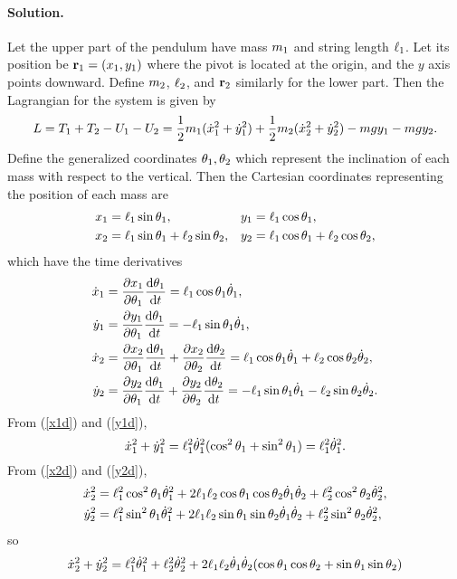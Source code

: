 \documentclass[11pt]{article}
\newcommand{\refeq}[1]{(\ref{#1})}
\newenvironment{solution}
{
    \paragraph{Solution.}
    \ignorespaces
}
{
    \bigskip
}
\begin{document}
\begin{solution}
	Let the upper part of the pendulum have mass $m_1$ and string length $\ell_1$.  Let its position be $\mathbf{r}_1 = (x_1, y_1)$ where the pivot is located at the origin, and the $y$ axis points downward.  Define $m_2$, $\ell_2$, and $\mathbf{r}_2$ similarly for the lower part.  Then the Lagrangian for the system is given by
	\begin{equation} \label{lagrdp}
		L = T_1 + T_2 - U_1 - U_2 = \frac{1}{2} m_1 (\dot{x}_1^2 + \dot{y}_1^2) + \frac{1}{2} m_2 (\dot{x}_2^2 + \dot{y}_2^2) - m g y_1 - m g y_2.
	\end{equation}
	Define the generalized coordinates $\theta_1, \theta_2$ which represent the inclination of each mass with respect to the vertical.  Then the Cartesian coordinates representing the position of each mass are
	\begin{align}
		x_1 &= \ell_1 \sin{\theta_1}, &
		y_1 &= \ell_1 \cos{\theta_1}, \\
		x_2 &= \ell_1 \sin{\theta_1} + \ell_2 \sin{\theta_2}, &
		y_2 &= \ell_1 \cos{\theta_1} + \ell_2 \cos{\theta_2},
	\end{align}
	which have the time derivatives
	\begin{align}
		\dot{x}_1 &= \pdv{x_1}{\theta_1} \dv{\theta_1}{t} = \ell_1 \cos{\theta_1} \dot{\theta}_1, \label{x1d} \\
		\dot{y}_1 &= \pdv{y_1}{\theta_1} \dv{\theta_1}{t} = -\ell_1 \sin{\theta_1} \dot{\theta}_1, \label{y1d} \\
		\dot{x}_2 &= \pdv{x_2}{\theta_1} \dv{\theta_1}{t} + \pdv{x_2}{\theta_2} \dv{\theta_2}{t} = \ell_1 \cos{\theta_1} \dot{\theta}_1 + \ell_2 \cos{\theta_2} \dot{\theta}_2, \label{x2d} \\
		\dot{y}_2 &= \pdv{y_2}{\theta_1} \dv{\theta_1}{t} + \pdv{y_2}{\theta_2} \dv{\theta_2}{t} = -\ell_1 \sin{\theta_1} \dot{\theta}_1 - \ell_2 \sin{\theta_2} \dot{\theta}_2. \label{y2d}
	\end{align}
	From \refeq{x1d} and \refeq{y1d},
	\begin{equation}
		\dot{x}_1^2 + \dot{y}_1^2 = \ell_1^2 \dot{\theta}_1^2 (\cos^2{\theta_1} + \sin^2{\theta_1}) = \ell_1^2 \dot{\theta}_1^2.
	\end{equation}
	From \refeq{x2d} and \refeq{y2d},
	\begin{align}
		\dot{x}_2^2 &= \ell_1^2 \cos^2{\theta_1} \dot{\theta}_1^2 + 2 \ell_1 \ell_2 \cos{\theta_1} \cos{\theta_2} \dot{\theta}_1 \dot{\theta}_2 + \ell_2^2 \cos^2{\theta_2} \dot{\theta}_2^2, \\
		\dot{y}_2^2 &= \ell_1^2 \sin^2{\theta_1} \dot{\theta}_1^2 + 2 \ell_1 \ell_2 \sin{\theta_1} \sin{\theta_2} \dot{\theta}_1 \dot{\theta}_2 + \ell_2^2 \sin^2{\theta_2} \dot{\theta}_2^2,
	\end{align}
	so
	\begin{align}
		\xdw^2 + \ydw^2 &= \elq^2 \thdq^2 + \elw^2 \thdw^2 + 2 \elq \elw \thdq \thdw (\cos{\thq} \cos{\thw} + \sin{\thq} \sin{\thw}) \\

\end{align}
\end{solution}
\end{document}
